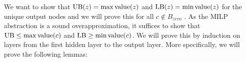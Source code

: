 				
				
				We want to show that $\mathrm{UB}(z) = \max {\textrm{value}} (z)$ and $\mathrm{LB}(z) = \min {\textrm{value}}(z)$ for the unique output nodes and we will prove this for all $c\notin B_{zero}$ . As the MILP abstraction is a sound overapproximation, 
				it suffices to show that $\mathrm{UB}\leq \max {\textrm{value}}(c)$ and $\mathrm{LB} \geq \min {\textrm{value}}(c)$. We will prove this by induction on layers from the first hidden layer to the output layer. More specifically, we will prove the following lemmas:
				
